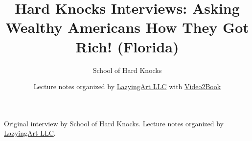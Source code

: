 \documentclass[11pt,oneside]{book}
\begin{document}
\frontmatter
\title{Hard Knocks Interviews: Asking Wealthy Americans How They Got Rich! (Florida)}
\author{School of Hard Knocks}
\date{Lecture notes organized by \href{https://lazying.art}{LazyingArt LLC} with \href{https://github.com/lachlanchen/Video2Book}{Video2Book}}
\maketitle
\begin{center}
\small Original interview by School of Hard Knocks. Lecture notes organized by \href{https://lazying.art}{LazyingArt LLC}.
\end{center}
\clearpage
\mainmatter

\end{document}
